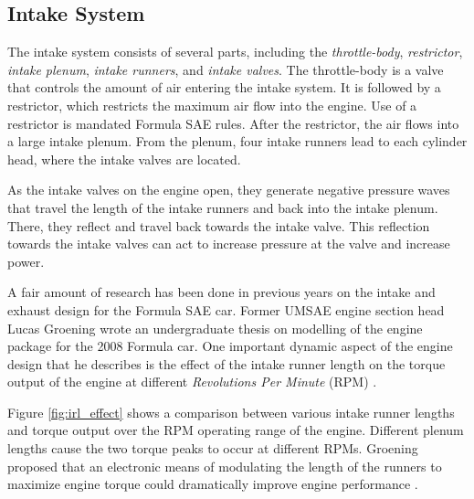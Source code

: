 \subsection{Intake System}

The intake system consists of several parts, including the \emph{throttle-body}, \emph{restrictor}, \emph{intake plenum}, \emph{intake runners}, and \emph{intake valves}. The throttle-body is a valve that controls the amount of air entering the intake system. It is followed by a restrictor, which restricts the maximum air flow into the engine. Use of a restrictor is mandated Formula SAE rules. After the restrictor, the air flows into a large intake plenum. From the plenum, four intake runners lead to each cylinder head, where the intake valves are located.

As the intake valves on the engine open, they generate negative pressure waves that travel the length of the intake runners and back into the intake plenum. There, they reflect and travel back towards the intake valve. This reflection towards the intake valves can act to increase pressure at the valve and increase power.


A fair amount of research has been done in previous years on the intake and exhaust design for the Formula SAE car. Former UMSAE engine section head Lucas Groening wrote an undergraduate thesis on modelling of the engine package for the 2008 Formula car. One important dynamic aspect of the engine design that he describes is the effect of the intake runner length on the torque output of the engine at different \emph{Revolutions Per Minute} (RPM) \cite{LucasIntake}. 

Figure \ref{fig:irl_effect} shows a comparison between various intake runner lengths and torque output over the RPM operating range of the engine. Different plenum lengths cause the two torque peaks to occur at different RPMs. Groening proposed that an electronic means of modulating the length of the runners to maximize engine torque could dramatically improve engine performance \cite{LucasIntake}.

